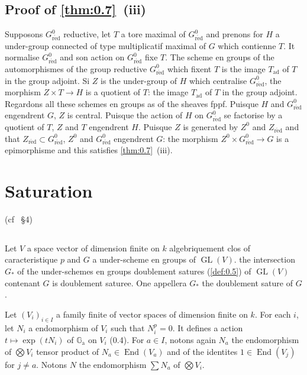 \documentclass[11pt,a4paper]{article}
\theoremstyle{plain}
\theoremstyle{definition}
\DeclareMathOperator{\End}{End}
\DeclareMathOperator{\GL}{GL}
\DeclareMathOperator{\ad}{ad}
\newcommand{\Ga}{\mathbb{G}_\mathrm{a}}
\newcommand{\red}{\mathrm{r\acute{e}d}}
\begin{document}
\subsection{Proof of \ref{thm:0.7}~(iii)}\label{sec:1.25}

Supposons $G^0_\red$ reductive, let $T$ a tore maximal of $G^0_\red$ and prenons for $H$ a under-group connected of type multiplicatif maximal of $G$ which contienne $T$. It normalise $G^0_\red$ and son action on $G^0_\red$ fixe $T$. The scheme en groups of the automorphismes of the group reductive $G^0_\red$ which fixent $T$ is the image $T_{\ad}$ of $T$ in the group adjoint. Si $Z$ is the under-group of $H$ which centralise $G^0_\red$, the morphism $Z \times T \to H$ is a quotient of $T$: the image $T_{\ad}$ of $T$ in the group adjoint. Regardons all these schemes en groups as of the sheaves fppf. Puisque $H$ and $G^0_\red$ engendrent $G$, $Z$ is central. Puisque the action of $H$ on $G^0_\red$ se factorise by a quotient of $T$, $Z$ and $T$ engendrent $H$. Puisque $Z$ is generated by $Z^0$ and $Z_\red$ and that $Z_\red \subset G^0_\red$, $Z^0$ and $G^0_\red$ engendrent $G$: the morphism $Z^0 \times G^0_\red \to G$ is a epimorphisme and this satisfies \ref{thm:0.7}~(iii).

\section{Saturation}\label{sec:2}

(cf \cite{Serre1994}~\S4)

\subsection{}
Let $V$ a space vector of dimension finite on $k$ algebriquement clos of caracteristique $p$ and $G$ a under-scheme en groups of $\GL(V)$. the intersection $G_*$ of the under-schemes en groups doublement satures (\ref{def:0.5}) of $\GL(V)$ contenant $G$ is doublement saturee. One appellera $G_*$ the doublement sature of $G$.

Let $(V_i)_{i \in I}$ a family finite of vector spaces of dimension finite on $k$. For each $i$, let $N_i$ a endomorphism of $V_i$ such that $N_i^p = 0$. It defines a action $t \mapsto \exp(tN_i)$ of $\Ga$ on $V_i$ (0.4). For $a \in I$, notons again $N_a$ the endomorphism of $\bigotimes V_i$ tensor product of $N_a \in \End(V_a)$ and of the identites $1 \in \End(V_j)$ for $j \neq a$. Notons $N$ the endomorphism $\sum N_a$ of $\bigotimes V_i$.
\end{document}
